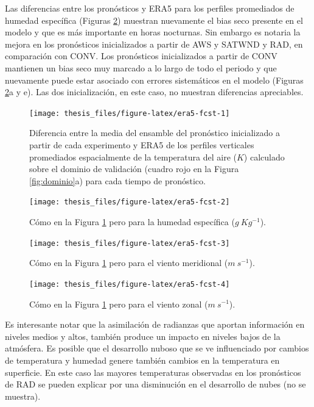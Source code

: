 \documentclass[12pt,oneside,a4paper]{reedthesis}
\begin{document}
Las diferencias entre los pronósticos y ERA5 para los perfiles promediados de humedad específica (Figuras \ref{fig:era5-fcst-2}) muestran nuevamente el bias seco presente en el modelo y que es más importante en horas nocturnas. Sin embargo es notaria la mejora en los pronósticos inicializados a partir de AWS y SATWND y RAD, en comparación con CONV. Los pronósticos inicializados a partir de CONV mantienen un bias seco muy marcado a lo largo de todo el periodo y que nuevamente puede estar asociado con errores sistemáticos en el modelo (Figuras \ref{fig:era5-fcst-2}a y e). Las dos inicialización, en este caso, no muestran diferencias apreciables.








\begin{figure}[ht]

{\centering \texttt{[image: thesis\_files/figure-latex/era5-fcst-1]} 

}

\caption{Diferencia entre la media del ensamble del pronóstico inicializado a partir de cada experimento y ERA5 de los perfiles verticales promediados espacialmente de la temperatura del aire (\(K\)) calculado sobre el dominio de validación (cuadro rojo en la Figura \ref{fig:dominio}a) para cada tiempo de pronóstico.}\label{fig:era5-fcst-1}
\end{figure}
\begin{figure}[ht]

{\centering \texttt{[image: thesis\_files/figure-latex/era5-fcst-2]} 

}

\caption{Cómo en la Figura \ref{fig:era5-fcst-1} pero para la humedad específica (\(g\ Kg^{-1}\)).}\label{fig:era5-fcst-2}
\end{figure}
\begin{figure}[ht]

{\centering \texttt{[image: thesis\_files/figure-latex/era5-fcst-3]} 

}

\caption{Cómo en la Figura \ref{fig:era5-fcst-1} pero para el viento meridional (\(m\ s^{-1}\)).}\label{fig:era5-fcst-3}
\end{figure}
\begin{figure}[ht]

{\centering \texttt{[image: thesis\_files/figure-latex/era5-fcst-4]} 

}

\caption{Cómo en la Figura \ref{fig:era5-fcst-1} pero para el viento zonal (\(m\ s^{-1}\)).}\label{fig:era5-fcst-4}
\end{figure}
Es interesante notar que la asimilación de radianzas que aportan información en niveles medios y altos, también produce un impacto en niveles bajos de la atmósfera. Es posible que el desarrollo nuboso que se ve influenciado por cambios de temperatura y humedad genere también cambios en la temperatura en superficie. En este caso las mayores temperaturas observadas en los pronósticos de RAD se pueden explicar por una disminución en el desarrollo de nubes (no se muestra).
\end{document}
